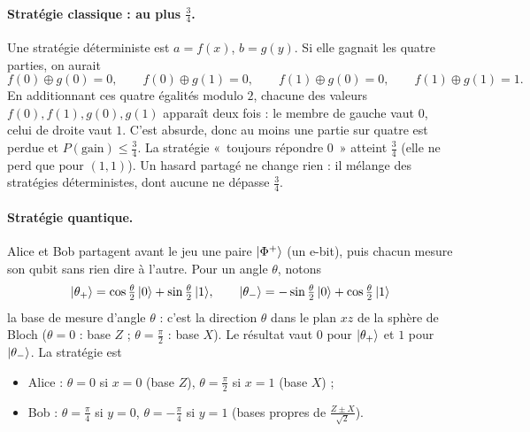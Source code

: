 \paragraph{Stratégie classique : au plus $\frac34$.} Une stratégie déterministe est $a=f(x)$,
$b=g(y)$. Si elle gagnait les quatre parties, on aurait
\[
  f(0)\oplus g(0)=0,\qquad f(0)\oplus g(1)=0,\qquad f(1)\oplus g(0)=0,\qquad f(1)\oplus g(1)=1 .
\]
En additionnant ces quatre égalités modulo $2$, chacune des valeurs $f(0),f(1),g(0),g(1)$ apparaît
deux fois : le membre de gauche vaut $0$, celui de droite vaut $1$. C'est absurde, donc au moins une
partie sur quatre est perdue et $P(\text{gain})\leq\frac34$. La stratégie «~toujours répondre $0$~»
atteint $\frac34$ (elle ne perd que pour $(1,1)$). Un hasard partagé ne change rien : il mélange des
stratégies déterministes, dont aucune ne dépasse $\frac34$.

\paragraph{Stratégie quantique.} Alice et Bob partagent avant le jeu une paire $|\Phi^+\rangle$ (un
e-bit), puis chacun mesure son qubit sans rien dire à l'autre. Pour un angle $\theta$, notons
\[
  |\theta_+\rangle=\cos\tfrac\theta2\,|0\rangle+\sin\tfrac\theta2\,|1\rangle,
  \qquad
  |\theta_-\rangle=-\sin\tfrac\theta2\,|0\rangle+\cos\tfrac\theta2\,|1\rangle
\]
la base de mesure d'angle $\theta$ : c'est la direction $\theta$ dans le plan $xz$ de la sphère de
Bloch ($\theta=0$ : base $Z$ ; $\theta=\frac\pi2$ : base $X$). Le résultat vaut $0$ pour
$|\theta_+\rangle$ et $1$ pour $|\theta_-\rangle$. La stratégie est
\begin{itemize}[nosep]
  \item Alice : $\theta=0$ si $x=0$ (base $Z$), $\theta=\frac\pi2$ si $x=1$ (base $X$) ;
  \item Bob : $\theta=\frac\pi4$ si $y=0$, $\theta=-\frac\pi4$ si $y=1$ (bases propres de
        $\frac{Z\pm X}{\sqrt2}$).
\end{itemize}


